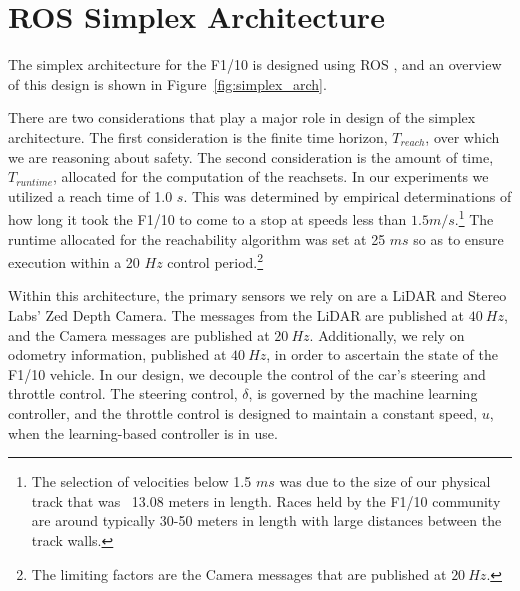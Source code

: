 \documentclass[manuscript,screen,review]{acmart}
\begin{document}
\section{ROS Simplex Architecture}

\label{section:simplex}
The simplex architecture for the F1/10 is designed using ROS \cite{ROS}, and an overview of this design is shown in Figure~\ref{fig:simplex_arch}. 

There are two considerations that play a major role in design of the simplex architecture. The first consideration is the finite time horizon, $T_{reach}$, over which we are reasoning about safety. The second consideration is the amount of time, $T_{runtime}$, allocated for the computation of the reachsets. In our experiments we utilized a reach time of 1.0 $s$. This was determined by empirical determinations of how long it took the F1/10 to come to a stop at speeds less than $1.5 m/s.$\footnote{The selection of velocities below 1.5 $ms$ was due to the size of our physical track that was ~13.08 meters in length. Races held by the F1/10 community are around typically 30-50 meters in length with large distances between the track walls.} The runtime allocated for the reachability algorithm was set at 25 $ms$ so as to ensure execution within a 20 $Hz$ control period.\footnote{The limiting factors are the Camera messages that are published at $20 \ Hz$.}  

Within this architecture, the primary sensors we rely on are a LiDAR and Stereo Labs' Zed Depth Camera. The messages from the LiDAR are published at $40 \ Hz$, and the Camera messages are published at $20 \ Hz$. Additionally, we rely on odometry information, published at $40 \ Hz$, in order to ascertain the state of the F1/10 vehicle. In our design, we decouple the control of the car's steering and throttle control. The steering control, $\delta$, is governed by the machine learning controller, and the throttle control is designed to maintain a constant speed, $u$, when the learning-based controller is in use. 

\end{document}
